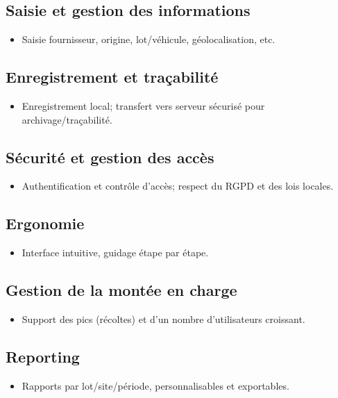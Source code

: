 \documentclass[12pt,a4paper]{report}
\begin{document}
\subsection*{Saisie et gestion des informations}
\begin{itemize}
    \item Saisie fournisseur, origine, lot/véhicule, géolocalisation, etc.
\end{itemize}

\subsection*{Enregistrement et traçabilité}
\begin{itemize}
    \item Enregistrement local; transfert vers serveur sécurisé pour archivage/traçabilité.
\end{itemize}

\subsection*{Sécurité et gestion des accès}
\begin{itemize}
    \item Authentification et contrôle d’accès; respect du RGPD et des lois locales.
\end{itemize}

\subsection*{Ergonomie}
\begin{itemize}
    \item Interface intuitive, guidage étape par étape.
\end{itemize}

\subsection*{Gestion de la montée en charge}
\begin{itemize}
    \item Support des pics (récoltes) et d’un nombre d’utilisateurs croissant.
\end{itemize}

\subsection*{Reporting}
\begin{itemize}
    \item Rapports par lot/site/période, personnalisables et exportables.
\end{itemize}
\end{document}
